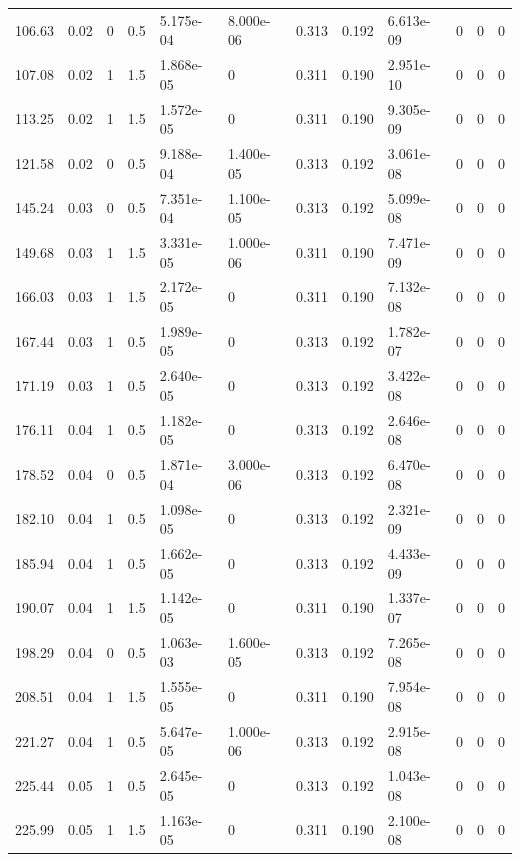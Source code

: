 \documentclass[preview]{standalone}
\begin{document}
{{\begin{tabular}{L{1.2cm}C{1.2cm} C{0.3cm}C{0.5cm} C{1.4cm}C{1.4cm} C{1.4cm}C{1.4cm} C{1.6cm}C{1.6cm} C{1.6cm}C{1.6cm}}
  106.63  &  0.02  & 0     & 0.5 &  5.175e-04  & 8.000e-06  &  0.313&   0.192& 6.613e-09 & 0   &  0 & 0  \\ 
  107.08  &  0.02  & 1     & 1.5 &  1.868e-05  & 0  &  0.311&   0.190& 2.951e-10 & 0   &  0 & 0  \\ 
  113.25  &  0.02  & 1     & 1.5 &  1.572e-05  & 0  &  0.311&   0.190& 9.305e-09 & 0   &  0 & 0  \\ 
  121.58  &  0.02  & 0     & 0.5 &  9.188e-04  & 1.400e-05  &  0.313&   0.192& 3.061e-08 & 0   &  0 & 0  \\ 
  145.24  &  0.03  & 0     & 0.5 &  7.351e-04  & 1.100e-05  &  0.313&   0.192& 5.099e-08 & 0   &  0 & 0  \\ 
  149.68  &  0.03  & 1     & 1.5 &  3.331e-05  & 1.000e-06  &  0.311&   0.190& 7.471e-09 & 0   &  0 & 0  \\ 
  166.03  &  0.03  & 1     & 1.5 &  2.172e-05  & 0  &  0.311&   0.190& 7.132e-08 & 0   &  0 & 0  \\ 
  167.44  &  0.03  & 1     & 0.5 &  1.989e-05  & 0  &  0.313&   0.192& 1.782e-07 & 0   &  0 & 0  \\ 
  171.19  &  0.03  & 1     & 0.5 &  2.640e-05  & 0  &  0.313&   0.192& 3.422e-08 & 0   &  0 & 0  \\ 
  176.11  &  0.04  & 1     & 0.5 &  1.182e-05  & 0  &  0.313&   0.192& 2.646e-08 & 0   &  0 & 0  \\ 
  178.52  &  0.04  & 0     & 0.5 &  1.871e-04  & 3.000e-06  &  0.313&   0.192& 6.470e-08 & 0   &  0 & 0  \\ 
  182.10  &  0.04  & 1     & 0.5 &  1.098e-05  & 0  &  0.313&   0.192& 2.321e-09 & 0   &  0 & 0  \\ 
  185.94  &  0.04  & 1     & 0.5 &  1.662e-05  & 0  &  0.313&   0.192& 4.433e-09 & 0   &  0 & 0  \\ 
  190.07  &  0.04  & 1     & 1.5 &  1.142e-05  & 0  &  0.311&   0.190& 1.337e-07 & 0   &  0 & 0  \\ 
  198.29  &  0.04  & 0     & 0.5 &  1.063e-03  & 1.600e-05  &  0.313&   0.192& 7.265e-08 & 0   &  0 & 0  \\ 
  208.51  &  0.04  & 1     & 1.5 &  1.555e-05  & 0  &  0.311&   0.190& 7.954e-08 & 0   &  0 & 0  \\ 
  221.27  &  0.04  & 1     & 0.5 &  5.647e-05  & 1.000e-06  &  0.313&   0.192& 2.915e-08 & 0   &  0 & 0  \\ 
  225.44  &  0.05  & 1     & 0.5 &  2.645e-05  & 0  &  0.313&   0.192& 1.043e-08 & 0   &  0 & 0  \\ 
  225.99  &  0.05  & 1     & 1.5 &  1.163e-05  & 0  &  0.311&   0.190& 2.100e-08 & 0   &  0 & 0  \\ 

\end{tabular}}}
\end{document}
